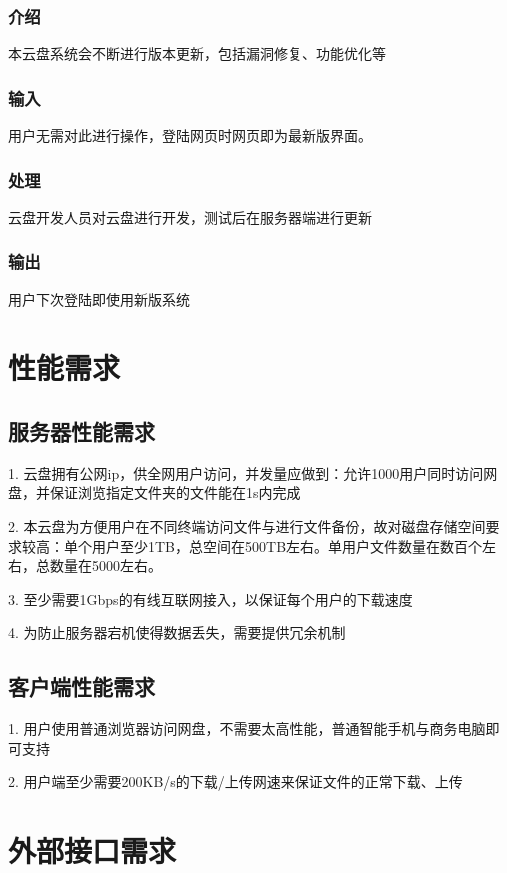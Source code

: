 \subsubsection{介绍}
本云盘系统会不断进行版本更新，包括漏洞修复、功能优化等
\subsubsection{输入} 
用户无需对此进行操作，登陆网页时网页即为最新版界面。

\subsubsection{处理} 
云盘开发人员对云盘进行开发，测试后在服务器端进行更新

\subsubsection{输出} 
用户下次登陆即使用新版系统


\section{性能需求}

\subsection{服务器性能需求}
 
1. 云盘拥有公网ip，供全网用户访问，并发量应做到：允许1000用户同时访问网盘，并保证浏览指定文件夹的文件能在1s内完成

2. 本云盘为方便用户在不同终端访问文件与进行文件备份，故对磁盘存储空间要求较高：单个用户至少1TB，总空间在500TB左右。单用户文件数量在数百个左右，总数量在5000左右。

3. 至少需要1Gbps的有线互联网接入，以保证每个用户的下载速度

4. 为防止服务器宕机使得数据丢失，需要提供冗余机制

\subsection{客户端性能需求}

1. 用户使用普通浏览器访问网盘，不需要太高性能，普通智能手机与商务电脑即可支持

2. 用户端至少需要200KB/s的下载/上传网速来保证文件的正常下载、上传

\section{外部接口需求}
